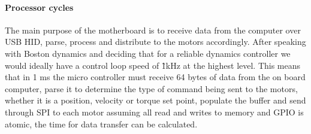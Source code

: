     \paragraph{Processor cycles}
        The main purpose of the motherboard is to receive data from the computer over USB HID, parse, process and distribute to the motors accordingly. After speaking with Boston dynamics and deciding that for a reliable dynamics controller we would ideally have a control loop speed of \~ 1kHz at the highest level. This means that in 1 ms the micro controller must receive 64 bytes of data from the on board computer, parse it to determine the type of command being sent to the motors, whether it is a position, velocity or torque set point, populate the buffer and send through SPI to each motor assuming all read and writes to memory and GPIO is atomic, the time for data transfer can be calculated. \newline
